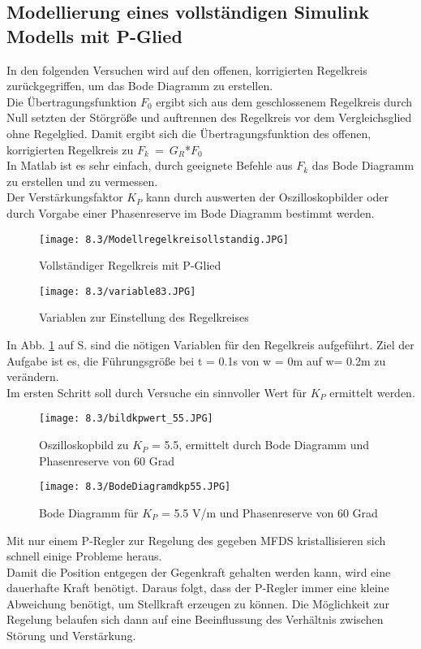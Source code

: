 \documentclass[12pt,a4paper]{scrartcl}	%
\begin{document}
\subsection{Modellierung eines vollständigen Simulink Modells mit P-Glied}
In den folgenden Versuchen wird auf den offenen, korrigierten Regelkreis zurückgegriffen, um das Bode Diagramm zu erstellen.\\
Die Übertragungsfunktion $F_0$ ergibt sich aus dem geschlossenem Regelkreis durch Null setzten der Störgröße und auftrennen des Regelkreis vor dem Vergleichsglied ohne Regelglied. Damit ergibt sich die Übertragungsfunktion des offenen, korrigierten Regelkreis zu \mbox{$F_k$ = $G_R$*$F_0$}\\
In Matlab ist es sehr einfach, durch geeignete Befehle aus $F_k$ das Bode Diagramm zu erstellen und zu vermessen.\\
Der Verstärkungsfaktor $K_P$ kann durch auswerten der Oszilloskopbilder oder durch Vorgabe einer Phasenreserve im Bode Diagramm bestimmt werden.
\begin{figure}[tbh]
	\centering
	\texttt{[image: 8.3/Modellregelkreisollstandig.JPG]}
	\caption{Vollständiger Regelkreis mit P-Glied}
	
\end{figure}
\begin{figure}[bh]
	\centering
	\texttt{[image: 8.3/variable83.JPG]}
	\caption{Variablen zur Einstellung des Regelkreises}
	\label{vari}
\end{figure}
In Abb. \ref{vari} auf S. \pageref{vari} sind die nötigen Variablen für den Regelkreis aufgeführt. Ziel der Aufgabe ist es, die Führungsgröße bei t = 0.1s von w = 0m auf w= 0.2m zu verändern.\\
Im ersten Schritt soll durch Versuche ein sinnvoller Wert für $K_P$ ermittelt werden.
\begin{figure}[tbh]
	\centering
	\texttt{[image: 8.3/bildkpwert\_55.JPG]}
	\caption{Oszilloskopbild zu $K_P$ = 5.5, ermittelt durch Bode Diagramm und Phasenreserve von 60 Grad}
\end{figure}
\begin{figure}[tbh]
	\centering
	\texttt{[image: 8.3/BodeDiagramdkp55.JPG]}
	\caption{Bode Diagramm für $K_P$ = 5.5 V/m und Phasenreserve von 60 Grad}
\end{figure}
Mit nur einem P-Regler zur Regelung des gegeben MFDS kristallisieren sich schnell einige Probleme heraus.\\
Damit die Position entgegen der Gegenkraft gehalten werden kann, wird eine dauerhafte Kraft benötigt. Daraus folgt, dass der P-Regler immer eine kleine Abweichung benötigt, um Stellkraft erzeugen zu können. Die Möglichkeit zur Regelung belaufen sich dann auf eine Beeinflussung des Verhältnis zwischen Störung und Verstärkung.
\clearpage
\end{document}

